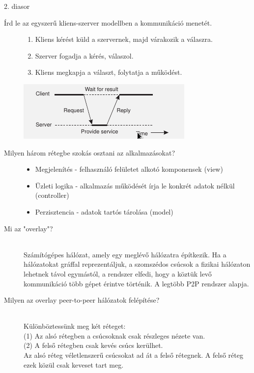 \documentclass[12pt]{article}
\begin{document}
2. diasor
\begin{description}
    \item [Írd le az egyszerű kliens-szerver modellben a kommunikáció menetét.]
        \hfill
        \begin{enumerate}
            \item Kliens kérést küld a szervernek, majd várakozik a válaszra. 
            \item Szerver fogadja a kérés, válaszol.
            \item Kliens megkapja a választ, folytatja a működést. 
        \end{enumerate}
        \begin{center}
            \includegraphics[scale=0.9]{images/CSCom.png}
        \end{center}
    \item[Milyen három rétegbe szokás osztani az alkalmazásokat?]
        \hfill
        \begin{itemize}
            \item Megjelenítés - felhasználó felületet alkotó komponensek (view)
            \item Üzleti logika - alkalmazás működését írja le konkrét adatok nélkül (controller)
            \item Perzisztencia - adatok tartós tárolása (model)
        \end{itemize}
    \item[Mi az "overlay"?]
        \hfill \\ Számítógépes hálózat, amely egy meglévő hálózatra építkezik. Ha a hálózatokat gráffal reprezentáljuk, a szomszédos csúcsok a fizikai hálózaton lehetnek távol egymástól, a rendszer elfedi, hogy a köztük levő kommunikáció több gépet érintve történik. A legtöbb P2P rendszer alapja.
    \item [Milyen az overlay peer-to-peer hálózatok felépítése?] 
        \hfill \\ Különböztessünk meg két réteget:\\(1) Az alsó rétegben a csúcsoknak csak részleges nézete van.\\(2) A felső rétegben csak kevés csúcs kerülhet.\\Az alsó réteg véletlenszerű csúcsokat ad át a felső rétegnek. A felső réteg ezek közül csak keveset tart meg.

\end{description}
\end{document}
